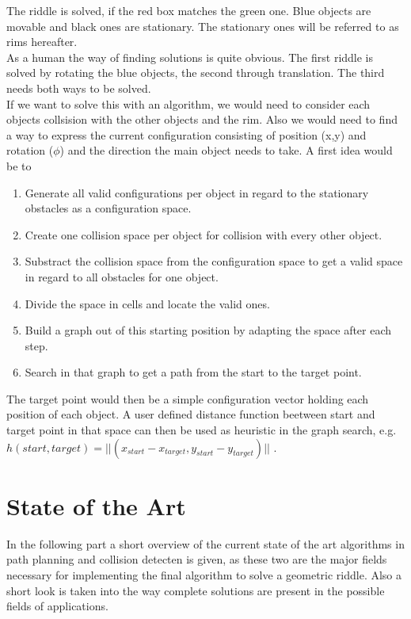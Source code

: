 The riddle is solved, if the red box matches the green one. Blue objects are movable and black ones are stationary. The stationary ones will be referred to as rims hereafter.\\
As a human the way of finding solutions is quite obvious. The first riddle is solved by rotating the blue objects, the second through translation. The third needs both ways to be solved.\\
If we want to solve this with an algorithm, we would need to consider each objects collsision with the other objects and the rim. Also we would need to find a way to express the current configuration consisting of position (x,y) and rotation ($\phi$) and the direction the main object needs to take. A first idea would be to 
\begin{enumerate}
\item Generate all valid configurations per object in regard to the stationary obstacles as a configuration space.
\item Create one collision space per object for collision with every other object. 
\item Substract the collision space from the configuration space to get a valid space in regard to all obstacles for one object.
\item Divide the space in cells and locate the valid ones.
\item Build a graph out of this starting position by adapting the space after each step.
\item Search in that graph to get a path from the  start to the target point.
\end{enumerate}

The target point would then be a simple configuration vector holding each position of each object. A user defined distance function beetween start and target point in that space can then be used as heuristic in the graph search, e.g. $h(start,target) = || ( x_{start} -  x_{target} , y_{start} - y_{target} ) ||$ .


\section{State of the Art}
In the following part a short overview of the current state of the art algorithms in path planning and collision detecten is given, as these two are the major fields necessary for implementing the final algorithm to solve a geometric riddle. Also a short look is taken into the way complete solutions are present in the possible fields of applications.
